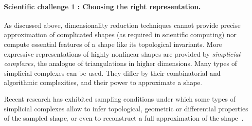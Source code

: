 \paragraph{Scientific challenge 1 :  Choosing the right representation.}


As discussed above, dimensionality reduction techniques cannot provide precise approximation of complicated shapes (as required in scientific computing) nor compute essential features of a shape like its topological invariants.
More expressive representations of  highly nonlinear shapes are provided %
by {\em simplicial complexes}, the analogue of triangulations in higher dimensions.
Many types of simplicial complexes can be used. They differ by their combinatorial and algorithmic complexities, and their power to approximate a shape.

 Recent research has exhibited sampling conditions under which some types of simplicial complexes allow to infer topological, geometric or differential properties
 of the sampled shape, or even to reconstruct  a full approximation of the shape~\cite{geometrica-7142i,geometrica-ccl09,nsw-fhm-2008}. 



